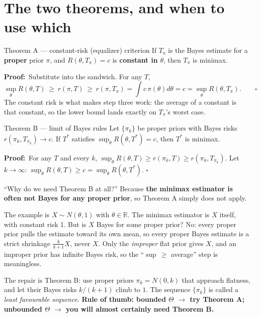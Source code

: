 \documentclass[11pt]{article}
\newcommand{\R}{\mathbb{R}}
\newcommand{\prf}{\smallskip\noindent\textbf{Proof:}\ }
\begin{document}
\section{The two theorems, and when to use which}

\begin{idea}{Theorem A --- constant-risk (equalizer) criterion}
If $T_\pi$ is the Bayes estimate for a \textbf{proper} prior $\pi$, and
$R(\theta,T_\pi)=c$ is \textbf{constant in $\theta$}, then $T_\pi$ is minimax.
\end{idea}

\prf Substitute into the sandwich. For any $T$,
\[
\sup_\theta R(\theta,T)\ \ge\ r(\pi,T)\ \ge\ r(\pi,T_\pi)
=\int c\,\pi(\theta)d\theta=c=\sup_\theta R(\theta,T_\pi).\qquad\square
\]
The constant risk is what makes step three work: the average of a constant is that constant,
so the lower bound lands exactly on $T_\pi$'s worst case.

\begin{idea}{Theorem B --- limit of Bayes rules}
Let $\{\pi_k\}$ be proper priors with Bayes risks $r(\pi_k,T_{\pi_k})\to c$. If $T^*$
satisfies $\sup_\theta R(\theta,T^*)=c$, then $T^*$ is minimax.
\end{idea}

\prf For any $T$ and every $k$, $\sup_\theta R(\theta,T)\ge r(\pi_k,T)\ge r(\pi_k,T_{\pi_k})$.
Let $k\to\infty$: $\sup_\theta R(\theta,T)\ge c=\sup_\theta R(\theta,T^*)$. $\square$

\begin{confusion}{``Why do we need Theorem B at all?''}
Because \textbf{the minimax estimator is often not Bayes for any proper prior}, so Theorem A
simply does not apply.

The example is $X\sim N(\theta,1)$ with $\theta\in\R$. The minimax estimator is $X$ itself,
with constant risk 1. But is $X$ Bayes for some proper prior? No: every proper prior pulls the
estimate toward its own mean, so every proper Bayes estimate is a strict shrinkage
$\frac{k}{k+1}X$, never $X$. Only the \emph{improper} flat prior gives $X$, and an improper
prior has infinite Bayes risk, so the ``$\sup\ \ge$ average'' step is meaningless.

The repair is Theorem B: use proper priors $\pi_k=N(0,k)$ that approach flatness, and let
their Bayes risks $k/(k+1)$ climb to $1$. The sequence $\{\pi_k\}$ is called a \emph{least
favourable sequence}. \textbf{Rule of thumb: bounded $\Theta$ $\to$ try Theorem A; unbounded
$\Theta$ $\to$ you will almost certainly need Theorem B.}
\end{confusion}
\end{document}
